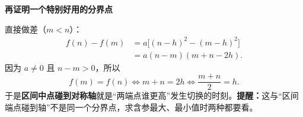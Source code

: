 \begin{proofbox}
\medskip
\textbf{\textcolor{CProof}{再证明一个特别好用的分界点}}

\begin{center}

\end{center}

直接做差（$m<n$）：
\[
\begin{aligned}
 f(n)-f(m)
 &=a\big[(n-h)^2-(m-h)^2\big]\\
 &=\boxed{a(n-m)(m+n-2h)}.
\end{aligned}
\]
因为 $a\ne0$ 且 $n-m>0$，所以
\[
 f(m)=f(n)\iff m+n=2h\iff\boxed{\frac{m+n}{2}=h}.
\]
于是\textbf{区间中点碰到对称轴}就是“两端点谁更高”发生切换的时刻。\textbf{提醒：}这与“区间端点碰到轴”不是同一个分界点，求含参最大、最小值时两种都要看。
\end{proofbox}
